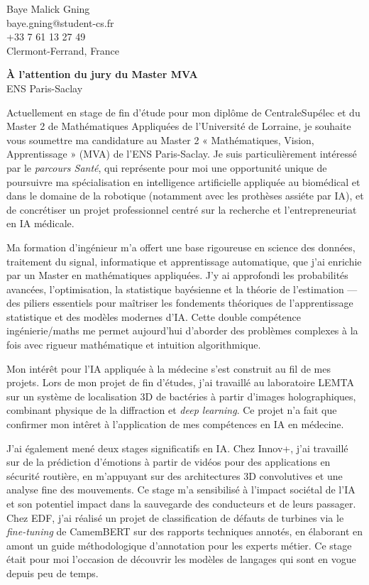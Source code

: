 
\begin{flushright}
Baye Malick Gning\\
baye.gning@student-cs.fr\\
+33 7 61 13 27 49\\
Clermont-Ferrand, France
\end{flushright}

\vspace{1cm}

\noindent
\textbf{À l’attention du jury du Master MVA}\\
ENS Paris-Saclay

\vspace{0.5cm}

Actuellement en stage de fin d'étude pour mon diplôme de CentraleSupélec et du Master 2 de Mathématiques Appliquées de l’Université de Lorraine, je souhaite vous soumettre ma candidature au Master 2 « Mathématiques, Vision, Apprentissage » (MVA) de l’ENS Paris-Saclay. Je suis particulièrement intéressé par le \textit{parcours Santé}, qui représente pour moi une opportunité unique de poursuivre ma spécialisation en intelligence artificielle appliquée au biomédical et dans le domaine de la robotique (notamment avec les prothèses assiéte par IA), et de concrétiser un projet professionnel centré sur la recherche et l’entrepreneuriat en IA médicale.

Ma formation d’ingénieur m’a offert une base rigoureuse en science des données, traitement du signal, informatique et apprentissage automatique, que j’ai enrichie par un Master en mathématiques appliquées. J’y ai approfondi les probabilités avancées, l’optimisation, la statistique bayésienne et la théorie de l’estimation — des piliers essentiels pour maîtriser les fondements théoriques de l’apprentissage statistique et des modèles modernes d’IA. Cette double compétence ingénierie/maths me permet aujourd’hui d’aborder des problèmes complexes à la fois avec rigueur mathématique et intuition algorithmique.

Mon intérêt pour l’IA appliquée à la médecine s’est construit au fil de mes projets. Lors de mon projet de fin d’études, j’ai travaillé au laboratoire LEMTA sur un système de localisation 3D de bactéries à partir d’images holographiques, combinant physique de la diffraction et \textit{deep learning}. Ce projet n'a fait que confirmer mon intêret à l'application de mes compétences en IA en médecine.


J’ai également mené deux stages significatifs en IA. Chez Innov+, j’ai travaillé sur de la prédiction d’émotions à partir de vidéos pour des applications en sécurité routière, en m’appuyant sur des architectures 3D convolutives et une analyse fine des mouvements. Ce stage m’a sensibilisé à l’impact sociétal de l’IA et son potentiel impact dans la sauvegarde des conducteurs et de leurs passager. Chez EDF, j’ai réalisé un projet de classification de défauts de turbines via le \textit{fine-tuning} de CamemBERT sur des rapports techniques annotés, en élaborant en amont un guide méthodologique d’annotation pour les experts métier. Ce stage était pour moi l'occasion de découvrir les modèles de langages qui sont en vogue depuis peu de temps.

